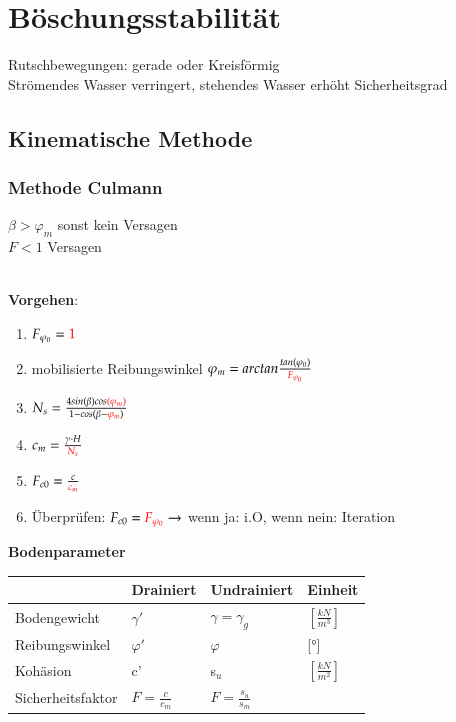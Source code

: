 \section{Böschungsstabilität}

Rutschbewegungen: gerade oder Kreisförmig \\
Strömendes Wasser verringert, stehendes Wasser erhöht Sicherheitsgrad
\subsection{Kinematische Methode}
\subsubsection{Methode Culmann}
$ \beta > \varphi_m $ sonst kein Versagen \\
$ F < 1 $ Versagen \\
\\
\begin{minipage}{0.55\linewidth}
		\textbf{Vorgehen}:
		\begin{enumerate}
			\item $ F_{\varphi_0} = \textcolor{red}{1} $
			\item mobilisierte Reibungswinkel $ \varphi_m = arctan \frac{tan (\varphi_0)}{\textcolor{red}{F_{\varphi_0}}} $
			\item $ N_s = \frac{4 sin (\beta) cos \textcolor{red}{(\varphi_m)}}{1 - cos (\beta - \textcolor{red}{\varphi_m})} $
			\item $ c_m = \frac{\gamma \cdot H}{\textcolor{red}{N_s}} $
			\item $ F_{c0} = \frac{c}{\textcolor{red}{c_m}} $
			\item Überprüfen: $ F_{c0} = \textcolor{red}{F_{\varphi_0}} \rightarrow $ wenn ja: i.O, wenn nein: Iteration
		\end{enumerate}
\end{minipage}
\begin{minipage}{0.5\linewidth}
	\textbf{Bodenparameter} \\
	\begin{tabular}{l|l|l|l}
					&	Drainiert			& Undrainiert			& Einheit \\ \hline
		
	Bodengewicht	&	$ \gamma' $			& $ \gamma = \gamma_g $ & $ [\frac{kN}{m^3}] $ \\
	Reibungswinkel	&	$ \varphi' $		& $ \varphi  $			& [°] \\
	Kohäsion		& c'					&  s$_u $				& $[ \frac{kN}{m^2} ]$ \\
	Sicherheitsfaktor & $ F=\frac{c}{c_m} $	& $ F=\frac{s_u}{s_m} $	& \\
	
	\end{tabular}
\end{minipage}


